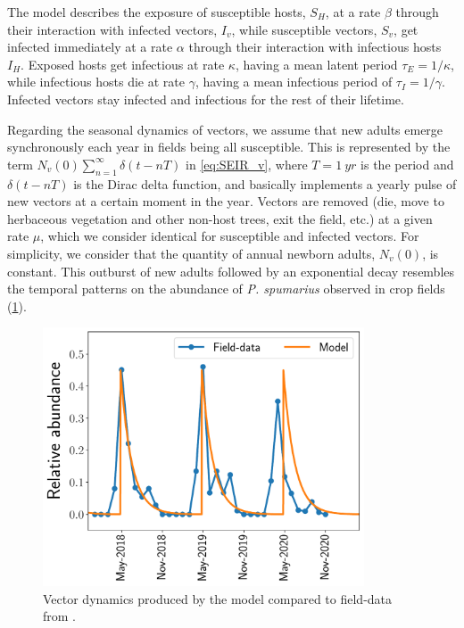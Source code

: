 The model describes the exposure of susceptible hosts, $S_H$, at a rate
$\beta$ through their interaction with infected vectors, $I_v$, while
susceptible vectors, $S_v$, get infected immediately at a rate $\alpha$ through
their interaction with infectious hosts $I_H$. Exposed hosts get infectious at
rate $\kappa$, having a mean latent period $\tau_E=1/\kappa$, while infectious
hosts die at rate $\gamma$, having a mean infectious period of
$\tau_I=1/\gamma$. Infected vectors stay infected and infectious for the rest
of their lifetime.

Regarding the seasonal dynamics of vectors, we assume that
new adults emerge synchronously each year in fields being all susceptible. This
is represented by the term $N_v(0)\sum_{n=1}^{\infty}\delta(t-nT)$ in
\cref{eq:SEIR_v}, where $T=\SI{1}{yr}$ is the period and $\delta(t-nT)$ is the
Dirac delta function, and basically implements a yearly pulse of new vectors at
a certain moment in the year. Vectors are removed (die, move to herbaceous
vegetation and other non-host trees, exit the field, etc.) at a given rate
$\mu$, which we consider identical for susceptible and infected vectors. For
simplicity, we consider that the quantity of annual newborn adults, $N_v(0)$,
is constant. This outburst of new adults followed by an exponential decay
resembles the temporal patterns on the abundance of \textit{P. spumarius}
observed in crop fields  \cite{Antonatos2021,Beal2021,Cornara2017,Lopez2021}
(\cref{fig:vector_dynamics}).

\begin{figure}[H]
    \centering
    \includegraphics[width=0.85\textwidth]{Figures/Vector_dynamics.pdf}
    \caption[Vector dynamics produced by the model compared to
        field-data]{Vector dynamics produced by the model compared to
        field-data
        from \cite{Lopez2021}.}
    \label{fig:vector_dynamics}
\end{figure}

